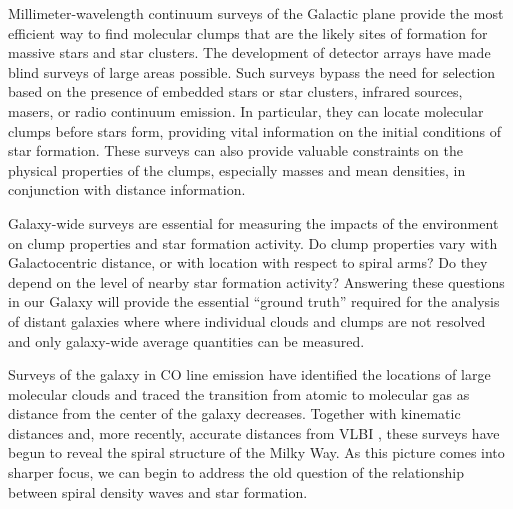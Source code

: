 \documentclass[12pt,preprint]{aastex}
\begin{document}
Millimeter-wavelength continuum surveys of the Galactic plane provide the most
efficient way to find molecular clumps that are the likely sites of formation
for massive stars and star clusters. The development of detector arrays have
made blind surveys of large areas possible.  Such surveys bypass the need for
selection based on the presence of embedded stars or star clusters, infrared
sources, masers, or radio continuum emission. In particular, they can locate
molecular clumps before stars form, providing vital information on the initial
conditions of star formation.  These surveys can also provide valuable
constraints on the physical properties of the clumps, especially masses and
mean densities, in conjunction with distance information.

Galaxy-wide surveys are essential for measuring the impacts of the
environment on clump properties and star formation activity.
Do clump properties vary with Galactocentric distance, or
with location with respect to spiral arms?  Do they depend on the
level of nearby star formation activity?
Answering these questions in our Galaxy will provide the
essential ``ground truth'' required for the analysis of distant
galaxies where where individual clouds and clumps are not resolved and
only galaxy-wide average quantities can be measured.

Surveys of the galaxy in CO line emission \citep{dame01,jackson06} have
identified the locations of large molecular clouds and traced
the transition from atomic to molecular gas as distance from the
center of the galaxy decreases. Together with kinematic distances
\citep[e.g.][]{RotationCurve} and, more recently, accurate distances
from VLBI \citep{reid09}, these surveys have begun to
reveal the spiral structure of the Milky Way. As this picture comes into
sharper focus, we can begin to address the old question of the relationship
between spiral density waves and star formation.
\end{document}
